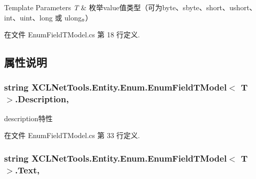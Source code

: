\begin{DoxyTemplParams}{Template Parameters}
{\em T} & 枚举value值类型（可为byte、sbyte、short、ushort、int、uint、long 或 ulong。）\\
\hline
\end{DoxyTemplParams}


在文件 Enum\-Field\-T\-Model.\-cs 第 18 行定义.



\subsection{属性说明}
\hypertarget{class_x_c_l_net_tools_1_1_entity_1_1_enum_1_1_enum_field_t_model_3_01_t_01_4_a6702736fc7d4f0f7cfefb74722f9c2ba}{
\subsubsection[{Description}]{\setlength{\rightskip}{0pt plus 5cm}string X\-C\-L\-Net\-Tools.\-Entity.\-Enum.\-Enum\-Field\-T\-Model$<$ T $>$.Description\hspace{0.3cm}{\ttfamily [get]}, {\ttfamily [set]}}}\label{class_x_c_l_net_tools_1_1_entity_1_1_enum_1_1_enum_field_t_model_3_01_t_01_4_a6702736fc7d4f0f7cfefb74722f9c2ba}


description特性 



在文件 Enum\-Field\-T\-Model.\-cs 第 33 行定义.

\hypertarget{class_x_c_l_net_tools_1_1_entity_1_1_enum_1_1_enum_field_t_model_3_01_t_01_4_a19570f5fcd9bb314ca1e7e8f3b8f44b1}{
\subsubsection[{Text}]{\setlength{\rightskip}{0pt plus 5cm}string X\-C\-L\-Net\-Tools.\-Entity.\-Enum.\-Enum\-Field\-T\-Model$<$ T $>$.Text\hspace{0.3cm}{\ttfamily [get]}, {\ttfamily [set]}}}\label{class_x_c_l_net_tools_1_1_entity_1_1_enum_1_1_enum_field_t_model_3_01_t_01_4_a19570f5fcd9bb314ca1e7e8f3b8f44b1}


